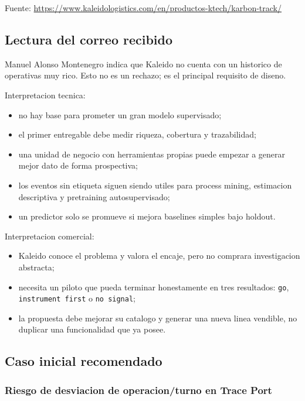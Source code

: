 \documentclass[
  spanish,
  10pt,
  a4paper,
]{article}
\providecommand{\tightlist}{%
  \setlength{\itemsep}{0pt}\setlength{\parskip}{0pt}}
\begin{document}
Fuente:
\url{https://www.kaleidologistics.com/en/productos-ktech/karbon-track/}

\subsection{Lectura del correo
recibido}\label{lectura-del-correo-recibido}

Manuel Alonso Montenegro indica que Kaleido no cuenta con un historico
de operativas muy rico. Esto no es un rechazo; es el principal requisito
de diseno.

Interpretacion tecnica:

\begin{itemize}
\tightlist
\item
  no hay base para prometer un gran modelo supervisado;
\item
  el primer entregable debe medir riqueza, cobertura y trazabilidad;
\item
  una unidad de negocio con herramientas propias puede empezar a generar
  mejor dato de forma prospectiva;
\item
  los eventos sin etiqueta siguen siendo utiles para process mining,
  estimacion descriptiva y pretraining autosupervisado;
\item
  un predictor solo se promueve si mejora baselines simples bajo
  holdout.
\end{itemize}

Interpretacion comercial:

\begin{itemize}
\tightlist
\item
  Kaleido conoce el problema y valora el encaje, pero no comprara
  investigacion abstracta;
\item
  necesita un piloto que pueda terminar honestamente en tres resultados:
  \texttt{go}, \texttt{instrument\ first} o \texttt{no\ signal};
\item
  la propuesta debe mejorar su catalogo y generar una nueva linea
  vendible, no duplicar una funcionalidad que ya posee.
\end{itemize}

\subsection{Caso inicial recomendado}\label{caso-inicial-recomendado}

\subsubsection{Riesgo de desviacion de operacion/turno en Trace
Port}\label{riesgo-de-desviacion-de-operacionturno-en-trace-port}
\end{document}
